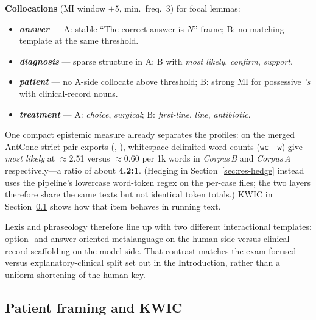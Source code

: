 \documentclass[11pt,a4paper]{article}
\newcommand{\CA}{\emph{Corpus\,A}}
\newcommand{\CB}{\emph{Corpus\,B}}
\begin{document}
\noindent\textbf{Collocations} (MI window $\pm 5$, min.\ freq.\ 3) for focal lemmas:
\begin{itemize}\setlength\itemsep{1pt}
\item \textbf{\emph{answer}} --- A: stable ``The correct answer is $N$'' frame; B: no matching template at the same threshold.
\item \textbf{\emph{diagnosis}} --- sparse structure in A; B with \emph{most likely}, \emph{confirm}, \emph{support}.
\item \textbf{\emph{patient}} --- no A-side collocate above threshold; B: strong MI for possessive \emph{'s} with clinical-record nouns.
\item \textbf{\emph{treatment}} --- A: \emph{choice}, \emph{surgical}; B: \emph{first-line}, \emph{line}, \emph{antibiotic}.
\end{itemize}
\noindent One compact epistemic measure already separates the profiles: on the merged AntConc strict-pair exports (, ), whitespace-delimited word counts (\texttt{wc -w}) give \emph{most likely} at $\approx$2.51 versus $\approx$0.60 per 1k words in \CB{} and \CA{} respectively---a ratio of about \textbf{4.2{:}1}. (Hedging in Section~\ref{sec:res-hedge} instead uses the pipeline's lowercase word-token regex on the per-case files; the two layers therefore share the same texts but not identical token totals.) KWIC in Section~\ref{sec:res-patient} shows how that item behaves in running text.

\noindent Lexis and phraseology therefore line up with two different interactional templates: option- and answer-oriented metalanguage on the human side versus clinical-record scaffolding on the model side. That contrast matches the exam-focused versus explanatory-clinical split set out in the Introduction, rather than a uniform shortening of the human key.

\FloatBarrier

\subsection{Patient framing and KWIC}\label{sec:res-patient}
\end{document}
